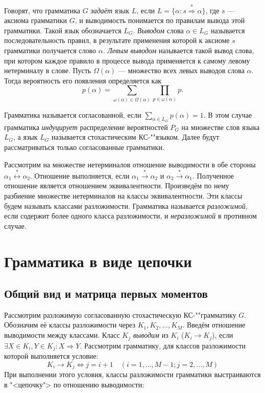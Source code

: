 \documentclass[12pt]{article}
\begin{document}
Говорят, что грамматика $G$ \emph{задаёт} язык $L$, если $L = \lbrace \alpha : s \stackrel{*}{\Rightarrow} \alpha \rbrace$, где $s$ --- аксиома грамматики $G$, и выводимость понимается по правилам вывода этой грамматики. Такой язык обозначается $L_G$. \emph{Выводом} слова $\alpha \in L_G$ называется последовательность правил, в результате применения которой к аксиоме $s$ грамматики получается слово $\alpha$. \emph{Левым выводом} называется такой вывод слова, при котором каждое правило в процессе вывода применяется к самому левому нетерминалу в слове. Пусть $\Omega(\alpha)$ --- множество всех левых выводов слова $\alpha$. Тогда вероятность его появления определяется как
\begin{equation*}
	p(\alpha) = \sum_{\omega(\alpha) \in \Omega(\alpha)} \prod_{p \in \omega(\alpha)} p.
\end{equation*}

Грамматика называется согласованной, если $\sum\limits_{\alpha \in L_G} p(\alpha) = 1$. В этом случае грамматика \emph{индуцирует} распределение вероятностей $P_G$ на множестве слов языка $L_G$, а язык $L_G$ называется стохастическим КС-""языком. Далее будут рассматриваться только согласованные грамматики.

Рассмотрим на множестве нетерминалов отношение выводимости в обе стороны $\alpha_1 \stackrel{*}{\leftrightarrow} \alpha_2$. Отношение выполняется, если $\alpha_1 \xrightarrow{*} \alpha_2$ и $\alpha_2 \xrightarrow{*} \alpha_1$. Полученное отношение является отношением эквивалентности. Произведём по нему разбиение множестве нетерминалов на классы эквивалентности. Эти классы будем называть классами разложимости. Грамматика называется \emph{разложимой}, если содержит более одного класса разложимости, и \emph{неразложимой} в противном случае.

\section{Грамматика в виде цепочки}

\subsection{Общий вид и матрица первых моментов}

Рассмотрим разложимую согласованную стохастическую КС-""грамматику $G$. Обозначим её классы разложимости через  $K_1, K_2, \ldots, K_M$. Введём отношение выводимости между классами. Класс $K_j$ \emph{выводим} из $K_i$ ($K_i \rightarrow K_j$), если $\exists X \in K_i, Y \in K_j : X \Rightarrow Y$. Рассмотрим грамматику, для классов разложимости которой выполняется условие:
\begin{equation}
\label{eq:chain_case}
	K_i \rightarrow K_j \Leftrightarrow j = i+1\quad (i=1,\ldots,M-1; j=2,\ldots,M)
\end{equation}
При выполнении этого условия, классы разложимости грамматики выстраиваются в "<цепочку"> по отношению выводимости:
\end{document}
